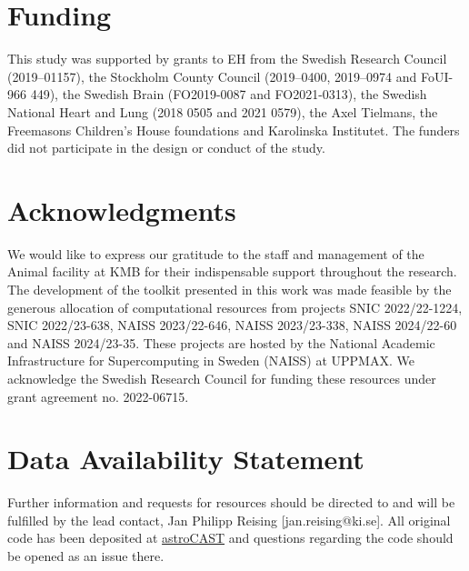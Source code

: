 \documentclass[utf8]{FrontiersinHarvard}
\begin{document}
    \section*{Funding}
    This study was supported by grants to EH from the Swedish Research Council (2019–01157), the Stockholm County Council (2019–0400, 2019–0974 and FoUI-966 449), the Swedish Brain (FO2019-0087 and FO2021-0313), the Swedish National Heart and Lung (2018 0505 and 2021 0579), the Axel Tielmans, the Freemasons Children's House foundations and Karolinska Institutet. The funders did not participate in the design or conduct of the study.

    \section*{Acknowledgments}
    We would like to express our gratitude to the staff and management of the Animal facility at KMB for their indispensable support throughout the research. The development of the toolkit presented in this work was made feasible by the generous allocation of computational resources from projects SNIC 2022/22-1224, SNIC 2022/23-638, NAISS 2023/22-646, NAISS 2023/23-338, NAISS 2024/22-60 and NAISS 2024/23-35. These projects are hosted by the National Academic Infrastructure for Supercomputing in Sweden (NAISS) at UPPMAX. We acknowledge the Swedish Research Council for funding these resources under grant agreement no. 2022-06715.

    \section*{Data Availability Statement}
    Further information and requests for resources  should be directed to and will be fulfilled by the lead contact, Jan Philipp Reising [jan.reising@ki.se]. All original code has been deposited at \href{https://github.com/janreising/astroCAST}{astroCAST} and questions regarding the code should be opened as an issue there.

    
\end{document}
